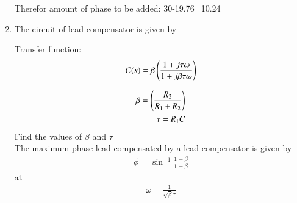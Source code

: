 \begin{enumerate}[label=\thesection.\arabic*.,ref=\thesection.\theenumi]
Therefor amount of phase to be added: 30-19.76=10.24





\item The circuit of lead compensator is given by
\begin{figure}[!ht]
    \centering
	\resizebox{\columnwidth}{!}{}
\caption{}
\label{fig:ee18btech11036_ckt}
\end{figure}

Transfer function:
\begin{align}
C(s)=\beta\brak{\frac{1+j\tau\omega}{1+j\beta\tau\omega}}
\label{eq:ee18btech11036_compensator}
\end{align}

\begin{align}
\beta=\brak{\frac{R_2}{R_1+R_2}}\\
\tau =R_1C
\label{eq:ee18btech11036_values}
\end{align}
Find the values of $\beta$ and $\tau$\\
\solution The maximum phase lead compensated by a lead compensator is given by\\
\begin{align}
\phi={\sin}^{-1}\frac{1-\beta}{1+\beta}
\label{eq:ee18btech11036_beta}
\end{align}
at
\begin{align}
\omega =\frac{1}{\sqrt{\beta}\tau}
\label{eq:ee18btech11036_omega}
\end{align}


\end{enumerate}
